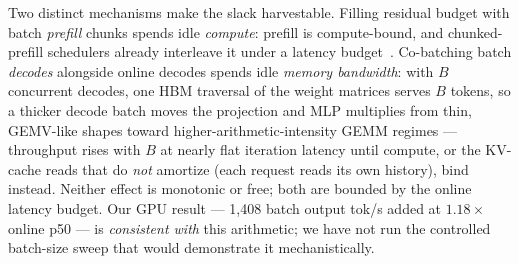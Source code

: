 \documentclass[conference]{IEEEtran}
\begin{document}
Two distinct mechanisms make the slack harvestable. Filling residual budget with batch
\emph{prefill} chunks spends idle \emph{compute}: prefill is compute-bound, and
chunked-prefill schedulers already interleave it under a latency
budget~\citep{sarathi}. Co-batching batch \emph{decodes} alongside online decodes spends
idle \emph{memory bandwidth}: with $B$ concurrent decodes, one HBM traversal of the
weight matrices serves $B$ tokens, so a thicker decode batch moves the projection and MLP
multiplies from thin, GEMV-like shapes toward higher-arithmetic-intensity GEMM regimes
--- throughput rises with $B$ at nearly flat iteration latency until compute, or the
KV-cache reads that do \emph{not} amortize (each request reads its own history), bind
instead. Neither effect is monotonic or free; both are bounded by the online latency
budget. Our GPU result --- 1{,}408 batch output tok/s added at $1.18\times$ online p50
--- is \emph{consistent with} this arithmetic; we have not run the controlled batch-size
sweep that would demonstrate it mechanistically.
\end{document}
